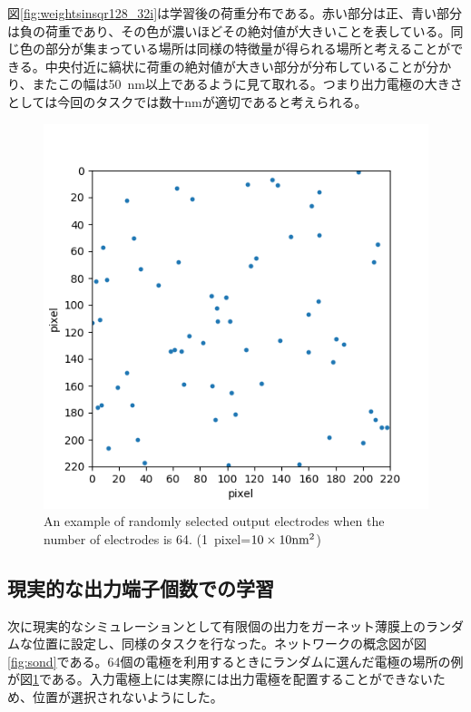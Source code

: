 \documentclass[a4j, twocolumn]{jsarticle}
\begin{document}
図\ref{fig:weightsinsqr128_32i}は学習後の荷重分布である。赤い部分は正、青い部分は負の荷重であり、その色が濃いほどその絶対値が大きいことを表している。同じ色の部分が集まっている場所は同様の特徴量が得られる場所と考えることができる。中央付近に縞状に荷重の絶対値が大きい部分が分布していることが分かり、またこの幅は50~nm以上であるように見て取れる。つまり出力電極の大きさとしては今回のタスクでは数十nmが適切であると考えられる。

\begin{figure}
\centering
\includegraphics[width=1\hsize]{./figures/psp_dotplotnn64_eta30_bs128_epoch2000_20190605l_using_neurons} 
\caption{An example of randomly selected output electrodes when the number of electrodes is 64. (1~pixel=$10\times10 \rm{nm^2}$)}
\label{fig:random}
\end{figure}

\subsection{現実的な出力端子個数での学習}
\label{subsec:limited}

次に現実的なシミュレーションとして有限個の出力をガーネット薄膜上のランダムな位置に設定し、同様のタスクを行なった。ネットワークの概念図が図\ref{fig:sond}である。64個の電極を利用するときにランダムに選んだ電極の場所の例が図\ref{fig:random}である。入力電極上には実際には出力電極を配置することができないため、位置が選択されないようにした。
\end{document}
